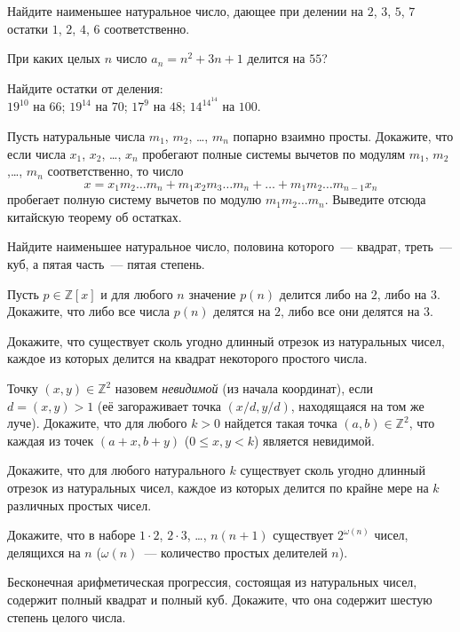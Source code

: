 \begin{problems}

\item
Найдите наименьшее натуральное число, дающее при делении на $2$, $3$, $5$, $7$
остатки $1$, $2$, $4$, $6$ соответственно.

\item
При каких целых $n$ число $a_n = n^2 + 3 n + 1$ делится на $55$?

\item
Найдите остатки от деления:
\\
\sbp $19^{10}$ на $66$;
\quad
\sbp $19^{14}$ на $70$;
\quad
\sbp $17^9$ на $48$;
\quad
\sbp $14^{14^{14}}$ на $100$.

\item
Пусть натуральные числа $m_1$, $m_2$, \ldots, $m_n$ попарно взаимно просты.
Докажите, что если числа $x_1$, $x_2$, \ldots, $x_n$ пробегают полные системы
вычетов по модулям $m_1$, $m_2$,\ldots, $m_n$ соответственно, то число
\[
    x
=
    x_1 m_2 \ldots m_n
    +
    m_1 x_2 m_3 \ldots m_n
    + \ldots +
    m_1 m_2 \ldots m_{n-1} x_n
\]
пробегает полную систему вычетов по модулю $m_1 m_2 \ldots m_n$.
Выведите отсюда китайскую теорему об остатках.

\item
Найдите наименьшее натуральное число, половина которого~--- квадрат,
треть~--- куб, а пятая часть~--- пятая степень.

\item
Пусть $p \in \mathbb{Z}[x]$ и для любого $n$ значение $p(n)$ делится либо на
$2$, либо на $3$.
Докажите, что либо все числа $p(n)$ делятся на $2$, либо все они делятся на
$3$.

\item
Докажите, что существует сколь угодно длинный отрезок из натуральных чисел,
каждое из которых делится на квадрат некоторого простого числа.

\item
Точку $(x, y) \in \mathbb{Z}^2$ назовем \emph{невидимой} (из начала координат),
если $d = (x, y) > 1$ (её загораживает точка $(x/d, y/d)$, находящаяся на том
же луче).
Докажите, что для любого $k > 0$ найдется такая точка
$(a, b) \in \mathbb{Z}^2$, что каждая из точек $(a + x, b + y)$
($0 \leq x, y < k$) является невидимой.

\item
Докажите, что для любого натурального $k$ существует сколь угодно длинный
отрезок из натуральных чисел, каждое из которых делится по крайне мере на $k$
различных простых чисел.

\item
Докажите, что в наборе $1 \cdot 2$, $2 \cdot 3$, \ldots, $n (n + 1)$
существует $2^{\omega(n)}$ чисел, делящихся на $n$
($\omega(n)$~--- количество простых делителей $n$).

\itemx{*}
Бесконечная арифметическая прогрессия, состоящая из натуральных чисел,
содержит полный квадрат и полный куб.
Докажите, что она содержит шестую степень целого числа.

\end{problems}

